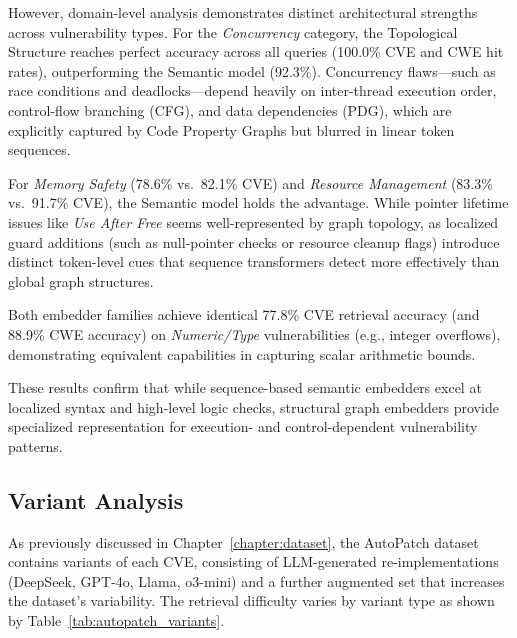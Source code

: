 However, domain-level analysis demonstrates distinct architectural strengths across vulnerability types.
For the \textit{Concurrency} category, the Topological Structure reaches perfect accuracy across all queries (100.0\% CVE and CWE hit rates), outperforming the Semantic model (92.3\%). Concurrency flaws—such as race conditions and deadlocks—depend heavily on inter-thread execution order, control-flow branching (CFG), and data dependencies (PDG), which are explicitly captured by Code Property Graphs but blurred in linear token sequences.
    
For \textit{Memory Safety} (78.6\% vs.\ 82.1\% CVE) and \textit{Resource Management} (83.3\% vs.\ 91.7\% CVE), the Semantic model holds the advantage. While pointer lifetime issues like \textit{Use After Free} seems well-represented by graph topology, as localized guard additions (such as null-pointer checks or resource cleanup flags) introduce distinct token-level cues that sequence transformers detect more effectively than global graph structures.
    
Both embedder families achieve identical 77.8\% CVE retrieval accuracy (and 88.9\% CWE accuracy) on \textit{Numeric/Type} vulnerabilities (e.g., integer overflows), demonstrating equivalent capabilities in capturing scalar arithmetic bounds.

These results confirm that while sequence-based semantic embedders excel at localized syntax and high-level logic checks, structural graph embedders provide specialized representation for execution- and control-dependent vulnerability patterns.

\subsection{Variant Analysis}

As previously discussed in Chapter~\ref{chapter:dataset}, the AutoPatch dataset contains variants of each CVE, consisting of LLM-generated re-implementations (DeepSeek, GPT-4o, Llama, o3-mini) and a further augmented set that increases the dataset's variability. 
The retrieval difficulty varies by variant type as shown by Table~\ref{tab:autopatch_variants}.

